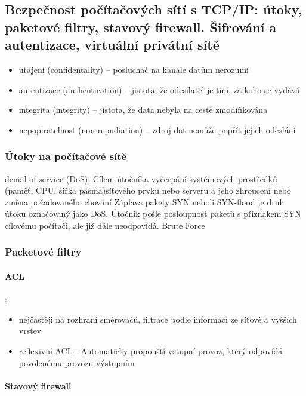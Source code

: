 \documentclass[10pt,a4paper]{article}
\begin{document}
\subsection{Bezpečnost počítačových sítí s TCP/IP: útoky, paketové filtry, stavový firewall. Šifrování a autentizace, virtuální privátní sítě}
\begin{itemize}
\item utajení (confidentality) – posluchač na kanále datům nerozumí
\item autentizace (authentication) – jistota, že odesílatel je tím, za koho se vydává
\item integrita (integrity) – jistota, že data nebyla na cestě zmodifikována
\item nepopiratelnost (non-repudiation) – zdroj dat nemůže popřít jejich odeslání
\end{itemize}

\subsubsection{Útoky na počítačové sítě}
denial of service (DoS): Cílem útočníka vyčerpání systémových prostředků (paměť, CPU, šířka pásma)síťového prvku nebo serveru a jeho zhroucení nebo změna požadovaného chování Záplava pakety SYN neboli SYN-flood je druh útoku označovaný jako DoS. Útočník pošle posloupnost paketů s příznakem SYN cílovému počítači, ale již dále neodpovídá. Brute Force
\subsubsection{Packetové filtry}
\paragraph{ACL}:

\begin{itemize}
\item nejčastěji na rozhraní směrovačů, filtrace podle informací ze síťové a vyšších vrstev
\item reflexivní ACL - Automaticky propouští vstupní provoz, který odpovídá povolenému provozu výstupním
\end{itemize}
\paragraph{Stavový firewall}
\end{document}
